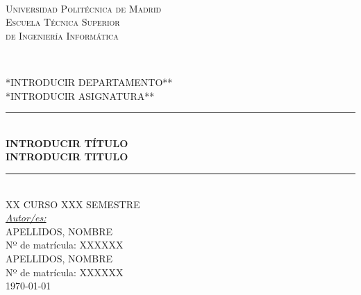 \documentclass[12pt,a4paper, spanish]{article}
\begin{document}
\begin{titlepage}
  \newcommand{\HRule}{\rule{\linewidth}{0.5mm}}
  \centering

  \textsc{}\\[0.25cm]

  \textsc{\huge Universidad Politécnica de Madrid}\\[0.5cm]

  \textsc{\LARGE Escuela Técnica Superior\\ de Ingeniería Informática}\\[0.3cm]

  \begin{figure}[H] %
    \centering
    \qquad
    \\[0.5cm]
  \end{figure}

  \textsc{\Large **INTRODUCIR DEPARTAMENTO**}\\[0.25cm]
  \textsc{\large **INTRODUCIR ASIGNATURA**}\\[0.25cm]

  \HRule\\[0.4cm]

  {\huge\bfseries INTRODUCIR TÍTULO\\[0.4cm] INTRODUCIR TITULO}\\[0.4cm]

  \HRule\\[1.25cm]


  \textsc{\large XX CURSO XXX SEMESTRE}\\[1.5cm]

  {\large\underline{\textit{Autor/es:}}}\\[0.2cm]
     \textsc{APELLIDOS, NOMBRE}\\
             Nº de matrícula: XXXXXX\\
     [0.5cm]
     \textsc{APELLIDOS, NOMBRE}\\
             Nº de matrícula: XXXXXX\\[0.5cm]

   \vfill\vfill\vfill
   {\large\today}

\end{titlepage}
\end{document}
